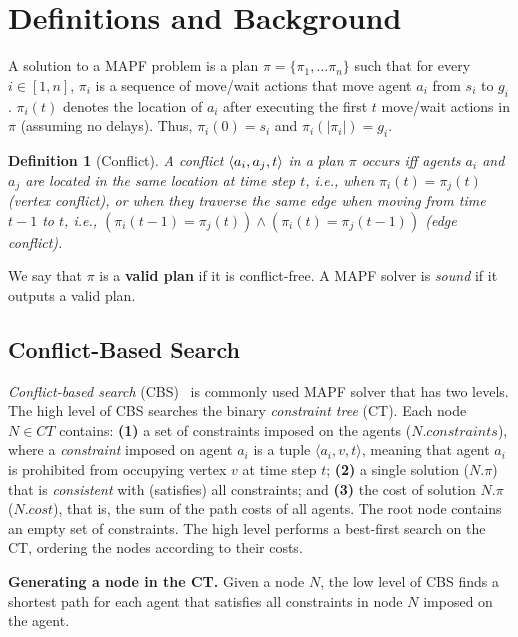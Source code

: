 \documentclass{article}
\newtheorem{definition}{Definition}
\begin{document}
\section{Definitions and Background}

A solution to a MAPF problem is 
a plan $\pi=\{\pi_1,\ldots \pi_n\}$ 
such that for every $i\in[1,n]$, $\pi_i$ is a sequence of move/wait actions that move agent $a_i$
from $s_i$ to $g_i$. 
$\pi_i(t)$ denotes the location
of $a_i$ after executing the first $t$ move/wait actions in $\pi$ (assuming no delays). Thus, $\pi_i(0)=s_i$ and $\pi_i(|\pi_i|)=g_i$. 

\begin{definition}[Conflict]
	A conflict $\left \langle a_i,a_j,t \right \rangle $ in a plan $\pi$
	occurs iff agents $a_i$ and $a_j$ are located in the same location at time
	step $t$, i.e., when $\pi_i(t)=\pi_j(t)$ (vertex conflict), or when they traverse the same edge when moving from time $t-1$ to $t$, i.e., 
    $(\pi_i(t-1)=\pi_j(t)) \wedge (\pi_i(t)=\pi_j(t-1))$ (edge conflict). 
\end{definition}
We say that $\pi$ is a {\bf valid plan} if it is conflict-free. A MAPF solver
is {\em sound} if it outputs  a valid plan. 

\subsection{Conflict-Based Search}
\label{subsec:cbs}
{\em Conflict-based search} (CBS)~\cite{CBSJUR} 
is commonly used MAPF solver that has two levels. The high level of CBS searches the binary {\em constraint
tree} (CT). Each node $N \in CT$ contains: {\bf (1)} a set of constraints
imposed on the agents ($N.constraints$), where a {\em constraint} imposed on
agent $a_i$ is a tuple $\langle a_i,v,t \rangle$, meaning that agent $a_i$ is
prohibited from occupying vertex $v$ at time step $t$; {\bf (2)} a single
solution ($N.\pi$) that is {\em consistent}  with (satisfies) all constraints; and {\bf (3)} the cost of solution $N.\pi$ ($N.cost$), that is, the sum of the path costs of all agents. The root node contains an empty set of constraints. The high level performs a best-first search on the CT, ordering the nodes according to their costs.

{\bf Generating a node in the CT.} Given a node $N$, the low level of CBS finds
a shortest path for each agent that satisfies all constraints in node $N$
imposed on the agent. 
\end{document}
